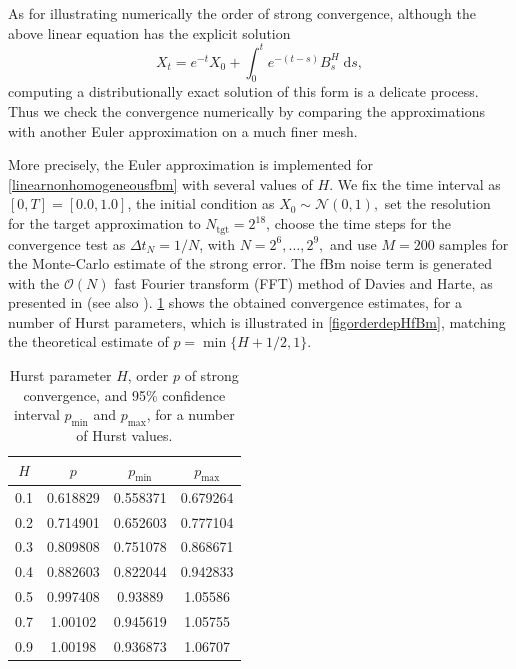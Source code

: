 \documentclass[reqno,12pt]{amsart}
\theoremstyle{plain} %
\theoremstyle{definition} %
\begin{document}
As for illustrating numerically the order of strong convergence, although the above linear equation has the explicit solution
\begin{equation}
    X_t = e^{-t}X_0 + \int_0^t e^{-(t-s)}B^H_s\;\mathrm{d}s,
\end{equation}
computing a distributionally exact solution of this form is a delicate process. Thus we check the convergence numerically by comparing the approximations with another Euler approximation on a much finer mesh.

More precisely, the Euler approximation is implemented for \eqref{linearnonhomogeneousfbm} with several values of $H$. We fix the time interval as $[0, T] = [0.0, 1.0]$, the initial condition as $X_0 \sim \mathcal{N}(0, 1),$ set the resolution for the target approximation to $N_{\textrm{tgt}} = 2^{18}$, choose the time steps for the convergence test as $\Delta t_N = 1/N$, with $N = 2^6, \ldots, 2^9,$ and use $M = 200$ samples for the Monte-Carlo estimate of the strong error. The fBm noise term is generated with the $\mathcal{O}(N)$ fast Fourier transform (FFT) method of Davies and Harte, as presented in \cite{DiekerMandjes2003} (see also \cite[Section 14.4]{HanKloeden2017}). \cref{taborderdepHfBm} shows the obtained convergence estimates, for a number of Hurst parameters, which is illustrated in \cref{figorderdepHfBm}, matching the theoretical estimate of $p = \min\{H+1/2, 1\}.$

\begin{table}
    \begin{tabular}[htb]{|c|c|c|c|}
        \hline $H$ & $p$ & $p_{\textrm{min}}$ & $p_{\textrm{max}}$ \\
        \hline \hline
        0.1 & 0.618829 & 0.558371 & 0.679264 \\
        0.2 & 0.714901 & 0.652603 & 0.777104 \\
        0.3 & 0.809808 & 0.751078 & 0.868671 \\
        0.4 & 0.882603 & 0.822044 & 0.942833 \\
        0.5 & 0.997408 & 0.93889 & 1.05586 \\
        0.7 & 1.00102 & 0.945619 & 1.05755 \\
        0.9 & 1.00198 & 0.936873 & 1.06707 \\
        \hline
    \end{tabular}
    \bigskip

    \caption{Hurst parameter $H$, order $p$ of strong convergence, and 95\% confidence interval $p_{\textrm{min}}$ and $p_{\textrm{max}}$, for a number of Hurst values.}
    \label{taborderdepHfBm}
\end{table}
\end{document}
